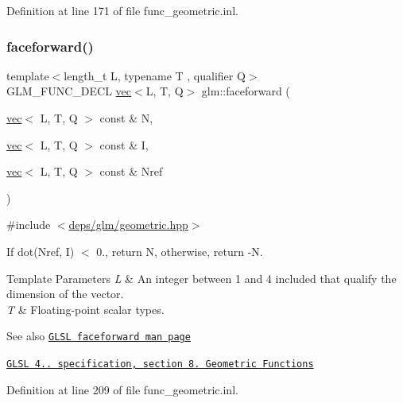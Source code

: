 Definition at line 171 of file func\+\_\+geometric.\+inl.

\mbox{\label{group__core__func__geometric_ga7aed0a36c738169402404a3a5d54e43b}} 
\subsubsection{\texorpdfstring{faceforward()}{faceforward()}}
{\footnotesize\ttfamily template$<$length\+\_\+t L, typename T , qualifier Q$>$ \\
G\+L\+M\+\_\+\+F\+U\+N\+C\+\_\+\+D\+E\+CL \hyperlink{structglm_1_1vec}{vec}$<$L, T, Q$>$ glm\+::faceforward (\begin{DoxyParamCaption}\item[{\hyperlink{structglm_1_1vec}{vec}$<$ L, T, Q $>$ const \&}]{N,  }\item[{\hyperlink{structglm_1_1vec}{vec}$<$ L, T, Q $>$ const \&}]{I,  }\item[{\hyperlink{structglm_1_1vec}{vec}$<$ L, T, Q $>$ const \&}]{Nref }\end{DoxyParamCaption})}



{\ttfamily \#include $<$\hyperlink{geometric_8hpp}{deps/glm/geometric.\+hpp}$>$}

If dot(\+Nref, I) $<$ 0., return N, otherwise, return -\/N.


\begin{DoxyTemplParams}{Template Parameters}
{\em L} & An integer between 1 and 4 included that qualify the dimension of the vector. \\
\hline
{\em T} & Floating-\/point scalar types.\\
\hline
\end{DoxyTemplParams}
\begin{DoxySeeAlso}{See also}
\href{http://www.opengl.org/sdk/docs/manglsl/xhtml/faceforward.xml}{\tt G\+L\+SL faceforward man page} 

\href{http://www.opengl.org/registry/doc/GLSLangSpec.4.20.8.pdf}{\tt G\+L\+SL 4.. specification, section 8. Geometric Functions} 
\end{DoxySeeAlso}


Definition at line 209 of file func\+\_\+geometric.\+inl.

\mbox{\label{group__core__func__geometric_ga0cdabbb000834d994a1d6dc56f8f5263}} 
